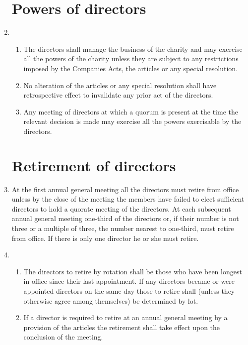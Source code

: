\documentclass{article}
\begin{document}
\begin{enumerate}[label=\arabic*, start=23]
    \section{Powers of directors}
    \item \begin{enumerate}[label=(\arabic*)]
        \item The directors shall manage the business of the charity and may
        exercise all the powers of the charity unless they are subject to
        any restrictions imposed by the Companies Acts, the articles or
        any special resolution.
        \item No alteration of the articles or any special resolution shall have
        retrospective effect to invalidate any prior act of the directors.
        \item Any meeting of directors at which a quorum is present at the
        time the relevant decision is made may exercise all the powers
        exercisable by the directors.
    \end{enumerate}
    
    \section{Retirement of directors}
    \item At the first annual general meeting all the directors must retire from
    office unless by the close of the meeting the members have failed to
    elect sufficient directors to hold a quorate meeting of the directors. At
    each subsequent annual general meeting one-third of the directors or, if
    their number is not three or a multiple of three, the number nearest to
    one-third, must retire from office. If there is only one director he or she
    must retire.
    \item \begin{enumerate}[label=(\arabic*)]
    \item The directors to retire by rotation shall be those who have been
    longest in office since their last appointment. If any directors
    became or were appointed directors on the same day those to
    retire shall (unless they otherwise agree among themselves) be
    determined by lot.
    \item If a director is required to retire at an annual general meeting by
    a provision of the articles the retirement shall take effect upon
    the conclusion of the meeting.
    \end{enumerate}
    

\end{enumerate}
\end{document}
